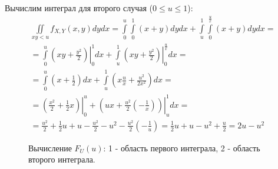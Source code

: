 \begin{enumerate}
    Вычислим интеграл для второго случая ($0 \le u \le 1$):
    \begin{multline}
        \iint \limits_{xy < u} f_{X,Y}(x, y) dy dx
        = \int \limits_0^u \int \limits_0^1 ( x + y ) dy dx + \int \limits_u^1 \int \limits_0^{\frac{u}{x}} ( x + y ) dy dx = \\
        = \int \limits_0^u \left . \left ( x y + \frac{y^2}{2} \right ) \right |_0^1 dx + \int \limits_u^1 \left . \left ( x y + \frac{y^2}{2} \right ) \right |_0^{\frac{u}{x}} dx = \\
        = \int \limits_0^u \left ( x + \frac{1}{2} \right ) dx + \int \limits_u^1 \left ( x \frac{u}{x} + \frac{u^2}{2x^2} \right ) dx = \\
        = \left . \left ( \frac{x^2}{2} + \frac{1}{2} x \right ) \right |_0^u + \left . \left ( u x + \frac{u^2}{2} \left ( - \frac{1}{x} \right ) \right ) \right |_u^1 dx = \\
        = \frac{u^2}{2} + \frac{1}{2} u + u - \frac{u^2}{2} - u^2 - \frac{u^2}{2} \left ( - \frac{1}{u} \right )
        = \frac{1}{2} u + u - u^2 + \frac{u}{2}
        = 2 u - u^2
    \end{multline}

    \begin{figure}[!h]
        \center
        \caption{Вычисление $F_U(u)$: 1 - область первого интеграла, 2 - область второго интеграла.}
    \end{figure}


\end{enumerate}
